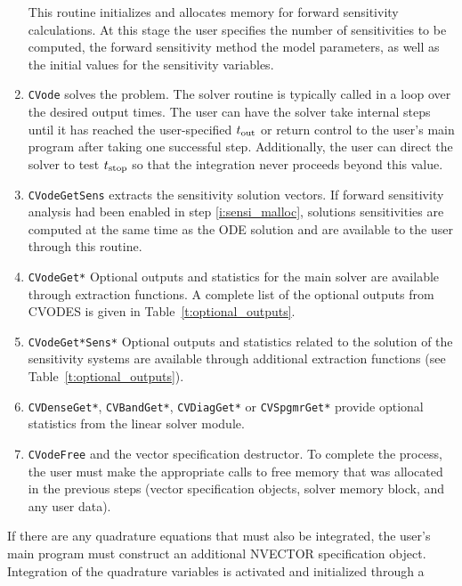 \begin{enumerate}
  This routine initializes and allocates memory for forward sensitivity calculations.
  At this stage the user specifies the number of sensitivities to be computed, 
  the forward sensitivity method 
  the model parameters, as well as the initial values for the sensitivity variables.
\item \label{i:solve}
  {\tt CVode} 
  solves the problem. 
  The solver routine is typically called in a loop over the desired output times.
  The user can have the solver take internal steps until it has reached the
  user-specified $t_{\mbox{\scriptsize out}}$ or return control to the user's
  main program after taking one successful step. Additionally, the user can
  direct the solver to test $t_{\mbox{\scriptsize stop}}$ so that the
  integration never proceeds beyond this value.
\item \label{i:getsensi}
  {\tt CVodeGetSens}
  extracts the sensitivity solution vectors. If forward sensitivity analysis
  had been enabled in step \ref{i:sensi_malloc}, solutions sensitivities are
  computed at the same time as the ODE solution and are available to the user
  through this routine.
\item \label{i:get}
  {\tt CVodeGet*} 
  Optional outputs and statistics for the main solver are available through 
  extraction functions. A complete list of the optional outputs from CVODES 
  is given in Table~\ref{t:optional_outputs}.
\item \label{i:sensi_get}
  {\tt CVodeGet*Sens*}
  Optional outputs and statistics related to the solution of the sensitivity 
  systems are available through additional extraction functions 
  (see Table~\ref{t:optional_outputs}).
\item \label{i:ls_get}  
  {\tt CVDenseGet*}, {\tt CVBandGet*}, {\tt CVDiagGet*} or {\tt CVSpgmrGet*}
  provide optional statistics from the linear solver module.
\item \label{i:free}
  {\tt CVodeFree} and the vector specification destructor.
  To complete the process, the user must make the appropriate calls to
  free memory that was allocated in the previous steps 
  (vector specification objects, solver memory block, and any user data).
\end{enumerate}
%
%
If there are any quadrature equations that must also be integrated, the user's 
main program must construct an additional NVECTOR specification object. 
Integration of the quadrature variables is activated and initialized through a 
